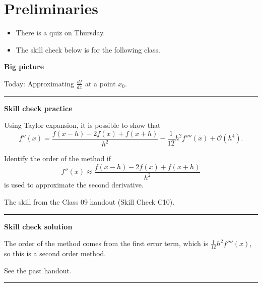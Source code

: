 \documentclass[12pt,letterpaper,noanswers]{exam}
\begin{document}
 \pdfpageheight 11in 
  \pdfpagewidth 8.5in

\noindent 

\section*{Preliminaries}

\begin{itemize}
\itemsep0pt
\item There is a quiz on Thursday.
\item The skill check below is for the following class.
\end{itemize}


\noindent\textbf{Big picture}

Today: Approximating $\frac{df}{dx}$ at a point $x_0$.

\vspace{0.2cm}
\hrule
\vspace{0.2cm}

\noindent \textbf{Skill check practice}
\begin{questions}
\item Using Taylor expansion, it is possible to show that \[f''(x) = \dfrac{f(x-h)-2f(x)+f(x+h)}{h^2} - \frac{1}{12}h^2 f''''(x) + \mathcal{O}(h^4).\]

Identify the order of the method if 
\[f''(x) \approx \dfrac{f(x-h)-2f(x)+f(x+h)}{h^2}\]
is used to approximate the second derivative.
\item The skill from the Class 09 handout (Skill Check C10).
\end{questions}


\vspace{0.2cm}
\hrule
\vspace{0.2cm}

\noindent \textbf{Skill check solution}
\begin{questions}
\item The order of the method comes from the first error term, which is $\frac{1}{12}h^2f''''(x)$, so this is a second order method.

\item See the past handout.
\end{questions}
\vspace{0.2cm}
\hrule
\vspace{0.2cm}
\end{document}
